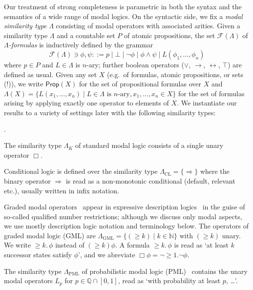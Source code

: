 \documentclass[proceedings]{stacs}
\theoremstyle{definition}
\theoremstyle{plain}
\renewcommand{\conj}{\wedge}
\newcommand{\disj}{\vee}
\newcommand{\modimpl}{\to}
\newcommand{\modiff}{\leftrightarrow}
\newcommand{\FLang}{\mathcal{F}}
\newcommand{\Nat}{{\mathbb{N}}}
\newcommand{\Prop}{\mathsf{Prop}}
\DeclareMathOperator{\mge}{\ge}
\newcommand{\AtProp}{P}
\newcommand{\Form}{\FLang}
\newcommand{\To}{\Rightarrow}
\newcommand{\GML}{\mathrm{GML}}
\newcommand{\CL}{\mathrm{CL}}
\newcommand{\PML}{\mathrm{PML}}
\newcounter{blubber}
\newenvironment{sparenumerate}
{\begin{list}
  {\arabic{blubber}.}
  {\usecounter{blubber}
   \setlength{\leftmargin}{0pt}
    \setlength{\parsep}{0pt}
    \setlength{\itemindent}{3ex}
    \setlength{\itemsep}{2pt}   
    \setlength{\listparindent}{3ex}
  }
}
{\end{list}}
\begin{document}
\noindent Our treatment of strong completeness is parametric in both
the syntax and the semantics of a wide range of modal logics. On the
syntactic side, we fix a \emph{modal similarity type} $\Lambda$
consisting of modal operators with associated arities. Given a
similarity type $\Lambda$ and a countable set $\AtProp$ of
atomic propositions, the set $\FLang(\Lambda)$ of
\emph{$\Lambda$-formulas} is inductively defined by the grammar
\begin{equation*}
 \Form(\Lambda) \ni \phi, \psi ::= p \mid \bot \mid \neg\phi\mid\phi \conj \psi \mid
L(\phi_1, \dots, \phi_n) 
\end{equation*}
where $p \in \AtProp$ and $L \in \Lambda$ is $n$-ary; further boolean
operators ($\disj$, $\modimpl$, $\modiff$, $\top$) are defined as
usual.  Given any set $X$ (e.g.\ of formulas, atomic propositions, or
sets (!)), we write $\Prop(X)$ for the set of propositional formulas
over $X$ and $\Lambda(X) = \lbrace L(x_1, \dots, x_n) \mid L \in
\Lambda \mbox{ is $n$-ary}, x_1, \dots, x_n \in X \rbrace$ for the set
of formulas arising by applying exactly one operator to elements of
$X$.  We instantiate our results to a variety of settings later with
the following similarity types:
\begin{exas} \label{expl:sim-types}
\begin{sparenumerate}
\item The similarity type $\Lambda_K$ of standard modal logic consists of a
single unary operator $\Box$.
\item Conditional logic \cite{Chellas80} is defined over the
  similarity type $\Lambda_\CL = \lbrace \To \rbrace$ where the binary
  operator $\To$ is read as a non-monotonic conditional (default,
  relevant etc.), usually written in infix notation.
\item Graded modal operators~\cite{Fine72} appear in expressive
  description logics~\cite{BaaderEA03} in the guise of so-called
  qualified number restrictions; although we discuss only modal
  aspects, we use mostly description logic notation and terminology
  below. The operators of graded modal logic (GML) are $\Lambda_{\GML}
  = \lbrace (\mge k) \mid k \in \Nat \rbrace$ with $(\mge k)$ unary.
  We write $\mge k.\, \phi$ instead of $(\mge k) \phi$. A formula
  $\mge k.\, \phi$ is read as `at least $k$ successor states satisfy
  $\phi$', and we abreviate $\Box \phi = \neg \mge 1. \neg \phi$.
\item The similarity type $\Lambda_\PML$ of probabilistic modal logic
  (PML)~\cite{LarsenSkou91} contains the unary modal operators $L_p$
  for $p \in \mathbb{Q} \cap [0, 1]$, read as `with probability at
  least $p$, \dots'.
\end{sparenumerate}
\end{exas}
\end{document}
